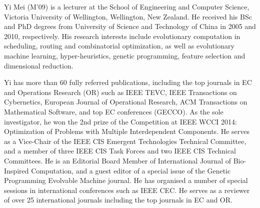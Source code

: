 \documentclass[10pt,journal,compsoc]{IEEEtran}
\begin{document}
\vspace{-9.5 mm}
\begin{IEEEbiography}{Yi Mei} (M’09)
is a lecturer at the School of Engineering and Computer Science, Victoria University of Wellington, Wellington, New Zealand. He received his BSc and PhD degrees from University of Science and Technology of China in 2005 and 2010, respectively. His research interests include evolutionary computation in scheduling, routing and combinatorial optimization, as well as evolutionary machine learning, hyper-heuristics, genetic programming, feature selection and dimensional reduction.

Yi has more than 60 fully referred publications, including the top journals in EC and Operations Research (OR) such as IEEE TEVC, IEEE Transactions on Cybernetics, European Journal of Operational Research, ACM Transactions on Mathematical Software, and top EC conferences (GECCO). As the sole investigator, he won the 2nd prize of the Competition at IEEE WCCI 2014: Optimization of Problems with Multiple Interdependent Components. He serves as a Vice-Chair of the IEEE CIS Emergent Technologies Technical Committee, and a member of three IEEE CIS Task Forces and two IEEE CIS Technical Committees. He is an Editorial Board Member of International Journal of Bio-Inspired Computation, and a guest editor of a special issue of the Genetic Programming Evolvable Machine journal. He has organised a number of special sessions in international conferences such as IEEE CEC. He serves as a reviewer of over 25 international journals including the top journals in EC and OR.
\end{IEEEbiography}
\end{document}
